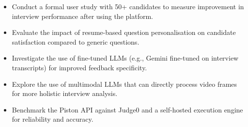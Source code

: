 \begin{itemize}
    \item Conduct a formal user study with 50+ candidates to measure improvement in interview performance after using the platform.
    \item Evaluate the impact of resume-based question personalisation on candidate satisfaction compared to generic questions.
    \item Investigate the use of fine-tuned LLMs (e.g., Gemini fine-tuned on interview transcripts) for improved feedback specificity.
    \item Explore the use of multimodal LLMs that can directly process video frames for more holistic interview analysis.
    \item Benchmark the Piston API against Judge0 and a self-hosted execution engine for reliability and accuracy.
\end{itemize}
